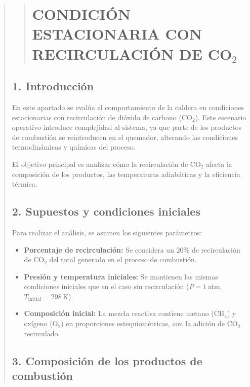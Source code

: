 \documentclass[11pt, a4paper]{article}
\begin{document}
\begin{quote}
\begin{center}
\begin{adjustwidth}{-1.7cm}{-1cm}
\begin{quote}
{\section{CONDICIÓN ESTACIONARIA CON RECIRCULACIÓN DE CO$_2$}\label{recirculacion}}
\end{quote}
\vspace*{1cm} %

\subsection*{1. Introducción}

En este apartado se evalúa el comportamiento de la caldera en condiciones estacionarias con recirculación de dióxido de carbono (\(\text{CO}_2\)). Este escenario operativo introduce complejidad al sistema, ya que parte de los productos de combustión se reintroducen en el quemador, alterando las condiciones termodinámicas y químicas del proceso.

El objetivo principal es analizar cómo la recirculación de \(\text{CO}_2\) afecta la composición de los productos, las temperaturas adiabáticas y la eficiencia térmica.

\subsection*{2. Supuestos y condiciones iniciales}

Para realizar el análisis, se asumen los siguientes parámetros:
\begin{itemize}
    \item \textbf{Porcentaje de recirculación:} Se considera un 20\% de recirculación de \(\text{CO}_2\) del total generado en el proceso de combustión.
    \item \textbf{Presión y temperatura iniciales:} Se mantienen las mismas condiciones iniciales que en el caso sin recirculación (\(P = 1 \, \text{atm}\), \(T_{\text{inicial}} = 298 \, \text{K}\)).
    \item \textbf{Composición inicial:} La mezcla reactiva contiene metano (\(\text{CH}_4\)) y oxígeno (\(\text{O}_2\)) en proporciones estequiométricas, con la adición de \(\text{CO}_2\) recirculado.
\end{itemize}

\subsection*{3. Composición de los productos de combustión}


\end{adjustwidth}
\end{center}
\end{quote}
\end{document}
